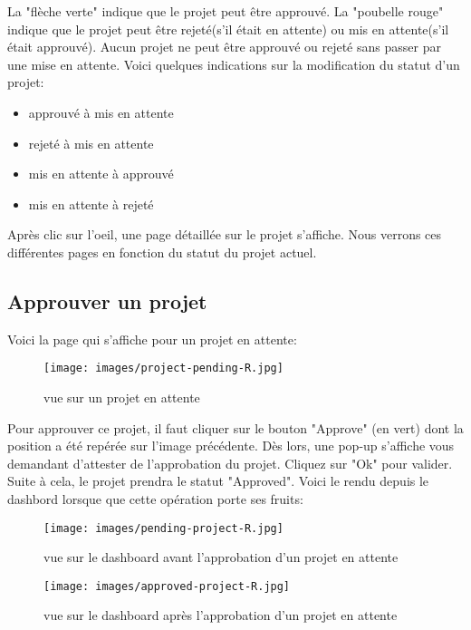 \documentclass[12pt]{article}
\begin{document}
    La "flèche verte" indique que le projet peut être approuvé. La "poubelle rouge" indique que le projet peut être rejeté(s'il était en attente) ou mis en attente(s'il était approuvé). Aucun projet ne peut être approuvé ou rejeté sans passer par une mise en attente. Voici quelques indications sur la modification du statut d'un projet:
    \begin{itemize}
    \item approuvé à mis en attente
    \item rejeté à mis en attente
    \item mis en attente à approuvé
    \item mis en attente à rejeté
    \end{itemize}  

\medskip
Après clic sur l'oeil, une page détaillée sur le projet s'affiche. Nous verrons ces différentes pages en fonction du statut du projet actuel. 

\medskip
\subsection{Approuver un projet}
Voici la page qui s'affiche pour un projet en attente:
    \begin{figure}[h!]
        \centering
        \texttt{[image: images/project-pending-R.jpg]}
        \caption{vue sur un projet en attente}
        \label{vue sur un projet en attente}
    \end{figure}

Pour approuver ce projet, il faut cliquer sur le bouton "Approve" (en vert) dont la position a été repérée sur l'image précédente. Dès lors, une pop-up s'affiche vous demandant d'attester de l'approbation du projet. Cliquez sur "Ok" pour valider. Suite à cela, le projet prendra le statut "Approved". Voici le rendu depuis le dashbord lorsque que cette opération porte ses fruits: 
    \begin{figure}[h!]
        \centering
        \texttt{[image: images/pending-project-R.jpg]}
        \caption{vue sur le dashboard avant l'approbation d'un projet en attente}
        \label{dashboard avant approbation d'un projet en attente}
    \end{figure}

\medskip

    \begin{figure}[h!]
        \centering
        \texttt{[image: images/approved-project-R.jpg]}
        \caption{vue sur le dashboard après l'approbation d'un projet en attente}
        \label{dashboard après approbation d'un projet en attente}
    \end{figure}
\end{document}
